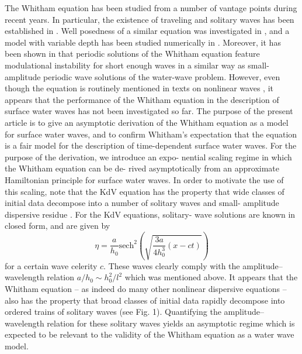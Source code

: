 The Whitham equation has been studied from a number of
vantage points during recent years. In particular, the existence of
traveling and solitary waves has been established in \citep{Ehrnstrom2012, Ehrnstrom2009}.
Well
posedness of a similar equation was investigated in \citetext{\citealp[]{Lannes2013}-\citealp[]{Klein2015}}, and a
model with variable depth has been studied numerically in \cite{Minzoni2013}.
Moreover, it has been shown in \citep{Hur2015, Sanford2014} that periodic solutions of
the Whitham equation feature modulational instability for short
enough waves in a similar way as small-amplitude periodic wave
solutions of the water-wave problem. However, even though the
equation is routinely mentioned in texts on nonlinear waves \citep{Drazin89, Whitham74}, it appears that the performance of the Whitham equation in
the description of surface water waves has not been investigated
so far.
The purpose of the present article is to give an asymptotic
derivation of the Whitham equation as a model for surface water
waves, and to confirm Whitham’s expectation that the equation is
a fair model for the description of time-dependent surface water
waves. For the purpose of the derivation, we introduce an expo-
nential scaling regime in which the Whitham equation can be de-
rived asymptotically from an approximate Hamiltonian principle
for surface water waves. In order to motivate the use of this scaling,
note that the KdV equation has the property that wide classes of
initial data decompose into a number of solitary waves and small-
amplitude dispersive residue \cite{Ablowitz81}. For the KdV equations, solitary-
wave solutions are known in closed form, and are given by
\begin{equation}
\eta = \frac{a}{h_0}\mbox{sech}^2\left(\sqrt{\frac{3a}{4h_0^3}(x - ct)}\right)
\label{kdv-soliton}
\end{equation}
for a certain wave celerity $c$. These waves clearly comply with
the amplitude–wavelength relation $a / h_0 \sim h_0^2 / l^2$ which was
mentioned above. It appears that the Whitham equation – as indeed do many other nonlinear dispersive equations – also has
the property that broad classes of initial data rapidly decompose
into ordered trains of solitary waves (see Fig. 1). Quantifying the
amplitude–wavelength relation for these solitary waves yields an
asymptotic regime which is expected to be relevant to the validity
of the Whitham equation as a water wave model.

